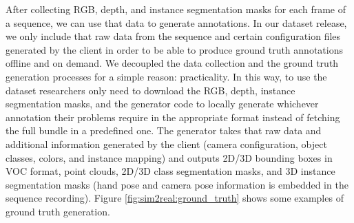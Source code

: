 After collecting RGB, depth, and instance segmentation masks for each frame of a sequence, we can use that data to generate annotations. In our dataset release, we only include that raw data from the sequence and certain configuration files generated by the client in order to be able to produce ground truth annotations offline and on demand. We decoupled the data collection and the ground truth generation processes for a simple reason: practicality. In this way, to use the dataset researchers only need to download the RGB, depth, instance segmentation masks, and the generator code to locally generate whichever annotation their problems require in the appropriate format instead of fetching the full bundle in a predefined one. The generator takes that raw data and additional information generated by the client (camera configuration, object classes, colors, and instance mapping) and outputs 2D/3D bounding boxes in VOC format, point clouds, 2D/3D class segmentation masks, and 3D instance segmentation masks (hand pose and camera pose information is embedded in the sequence recording). Figure \ref{fig:sim2real:ground_truth} shows some examples of ground truth generation.

\clearpage

